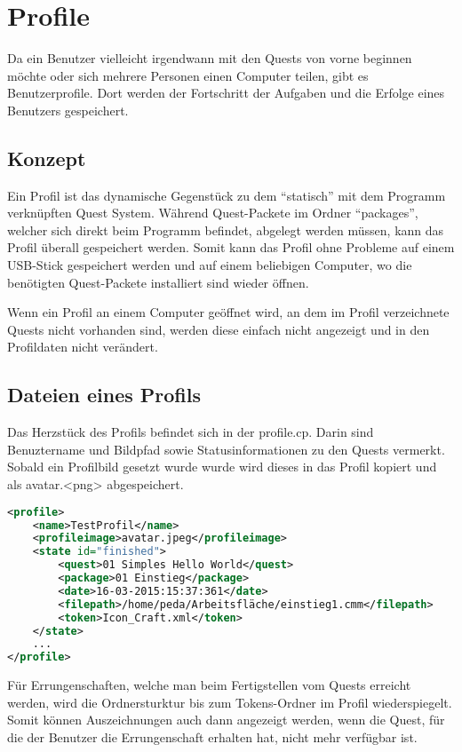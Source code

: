 \section{Profile}
Da ein Benutzer vielleicht irgendwann mit den Quests von vorne beginnen möchte oder sich mehrere Personen einen Computer teilen, gibt es Benutzerprofile. Dort werden der Fortschritt der Aufgaben und die Erfolge eines Benutzers gespeichert.

\subsection{Konzept}
Ein Profil ist das dynamische Gegenstück zu dem "`statisch"' mit dem Programm verknüpften Quest System. Während Quest-Packete im Ordner "`packages"', welcher sich direkt beim Programm befindet, abgelegt werden müssen, kann das Profil überall gespeichert werden. Somit kann das Profil ohne Probleme auf einem USB-Stick gespeichert werden und auf einem beliebigen Computer, wo die benötigten Quest-Packete installiert sind wieder öffnen.

Wenn ein Profil an einem Computer geöffnet wird, an dem im Profil verzeichnete Quests nicht vorhanden sind, werden diese einfach nicht angezeigt und in den Profildaten nicht verändert.

\subsection{Dateien eines Profils}
Das Herzstück des Profils befindet sich in der profile.cp. Darin sind Benuztername und Bildpfad sowie Statusinformationen zu den Quests vermerkt. Sobald ein Profilbild gesetzt wurde wurde wird dieses in das Profil kopiert und als avatar.<png> abgespeichert.

\begin{lstlisting}[language=XML]
<profile>
	<name>TestProfil</name>
	<profileimage>avatar.jpeg</profileimage>
	<state id="finished">
		<quest>01 Simples Hello World</quest>
		<package>01 Einstieg</package>
		<date>16-03-2015:15:37:361</date>
		<filepath>/home/peda/Arbeitsfläche/einstieg1.cmm</filepath>
		<token>Icon_Craft.xml</token>
	</state>
	...
</profile>
\end{lstlisting}

Für Errungenschaften, welche man beim Fertigstellen vom Quests erreicht werden, wird die Ordnersturktur bis zum Tokens-Ordner im Profil wiederspiegelt. Somit können Auszeichnungen auch dann angezeigt werden, wenn die Quest, für die der Benutzer die Errungenschaft erhalten hat, nicht mehr verfügbar ist.

